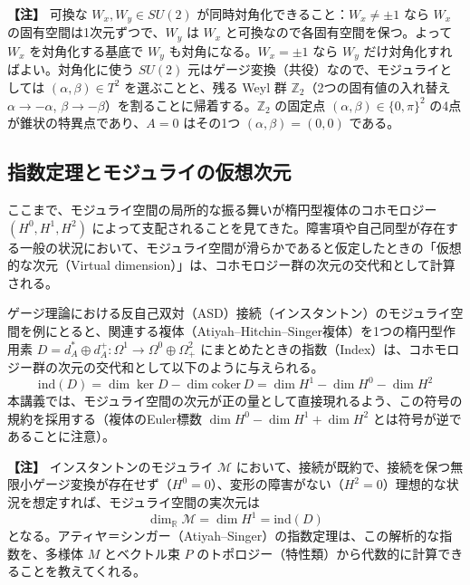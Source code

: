 \documentclass[uplatex, dvipdfmx, book]{jsbook}
\let\origsubsection\subsection
\let\origsubsubsection\subsubsection
\renewcommand{\section}{\origsubsection}
\renewcommand{\subsection}{\origsubsubsection}
\renewcommand{\subsubsection}{\paragraph}
\newenvironment{note}{\vspace{1ex}\par\footnotesize\noindent\textbf{【注】}}{\par\vspace{1ex}}
\begin{document}
\begin{note}
可換な $W_x, W_y \in SU(2)$ が同時対角化できること：$W_x \neq \pm 1$ なら $W_x$ の固有空間は1次元ずつで、$W_y$ は $W_x$ と可換なので各固有空間を保つ。よって $W_x$ を対角化する基底で $W_y$ も対角になる。$W_x = \pm 1$ なら $W_y$ だけ対角化すればよい。対角化に使う $SU(2)$ 元はゲージ変換（共役）なので、モジュライとしては $(\alpha, \beta) \in T^2$ を選ぶことと、残る Weyl 群 $\mathbb{Z}_2$（2つの固有値の入れ替え $\alpha \to -\alpha$, $\beta \to -\beta$）を割ることに帰着する。$\mathbb{Z}_2$ の固定点 $(\alpha,\beta) \in \{0, \pi\}^2$ の4点が錐状の特異点であり、$A = 0$ はその1つ $(\alpha, \beta) = (0, 0)$ である。
\end{note}

\section{指数定理とモジュライの仮想次元}

ここまで、モジュライ空間の局所的な振る舞いが楕円型複体のコホモロジー $(H^0, H^1, H^2)$ によって支配されることを見てきた。障害項や自己同型が存在する一般の状況において、モジュライ空間が滑らかであると仮定したときの「仮想的な次元（Virtual dimension）」は、コホモロジー群の次元の交代和として計算される。

ゲージ理論における反自己双対（ASD）接続（インスタントン）のモジュライ空間を例にとると、関連する複体（Atiyah--Hitchin--Singer複体）を1つの楕円型作用素 $D = d_A^* \oplus d_A^+ : \Omega^1 \to \Omega^0 \oplus \Omega^2_+$ にまとめたときの指数（Index）は、コホモロジー群の次元の交代和として以下のように与えられる。
\begin{equation}
    \mathrm{ind}(D) = \dim \ker D - \dim \mathrm{coker}\, D = \dim H^1 - \dim H^0 - \dim H^2
\end{equation}
本講義では、モジュライ空間の次元が正の量として直接現れるよう、この符号の規約を採用する（複体のEuler標数 $\dim H^0 - \dim H^1 + \dim H^2$ とは符号が逆であることに注意）。

\begin{note}
インスタントンのモジュライ $\mathcal{M}$ において、接続が既約で、接続を保つ無限小ゲージ変換が存在せず（$H^0=0$）、変形の障害がない（$H^2=0$）理想的な状況を想定すれば、モジュライ空間の実次元は
\begin{equation}
    \dim_{\mathbb{R}} \mathcal{M} = \dim H^1 = \mathrm{ind}(D)
\end{equation}
となる。アティヤ＝シンガー（Atiyah--Singer）の指数定理は、この解析的な指数を、多様体 $M$ とベクトル束 $P$ のトポロジー（特性類）から代数的に計算できることを教えてくれる。
\end{note}
\end{document}
